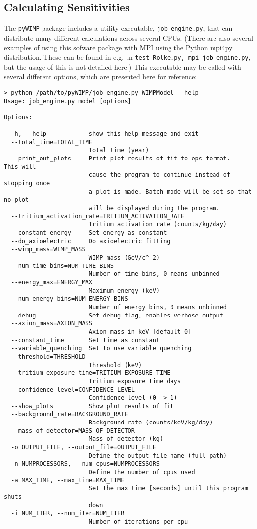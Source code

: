 		\subsection{Calculating Sensitivities}
The \lstinline!pyWIMP! package includes a utility executable, \lstinline!job_engine.py!, that can distribute
many different calculations across several CPUs.  (There are also several examples of using this sofware package
with MPI using the Python mpi4py distribution.  These can be found in e.g.~in \lstinline!test_Rolke.py, mpi_job_engine.py!, 
but the usage of this is not detailed here.)  This executable may be called with several different options, which are presented
here for reference:

				\lstset{language=csh, tabsize=4}
				\begin{lstlisting}	
> python /path/to/pyWIMP/job_engine.py WIMPModel --help
Usage: job_engine.py model [options]

Options:

  -h, --help            show this help message and exit
  --total_time=TOTAL_TIME
                        Total time (year)
  --print_out_plots     Print plot results of fit to eps format.   This will
                        cause the program to continue instead of stopping once
                        a plot is made. Batch mode will be set so that no plot
                        will be displayed during the program.
  --tritium_activation_rate=TRITIUM_ACTIVATION_RATE
                        Tritium activation rate (counts/kg/day)
  --constant_energy     Set energy as constant
  --do_axioelectric     Do axioelectric fitting
  --wimp_mass=WIMP_MASS
                        WIMP mass (GeV/c^-2)
  --num_time_bins=NUM_TIME_BINS
                        Number of time bins, 0 means unbinned
  --energy_max=ENERGY_MAX
                        Maximum energy (keV)
  --num_energy_bins=NUM_ENERGY_BINS
                        Number of energy bins, 0 means unbinned
  --debug               Set debug flag, enables verbose output
  --axion_mass=AXION_MASS
                        Axion mass in keV [default 0]
  --constant_time       Set time as constant
  --variable_quenching  Set to use variable quenching
  --threshold=THRESHOLD
                        Threshold (keV)
  --tritium_exposure_time=TRITIUM_EXPOSURE_TIME
                        Tritium exposure time days
  --confidence_level=CONFIDENCE_LEVEL
                        Confidence level (0 -> 1)
  --show_plots          Show plot results of fit
  --background_rate=BACKGROUND_RATE
                        Background rate (counts/keV/kg/day)
  --mass_of_detector=MASS_OF_DETECTOR
                        Mass of detector (kg)
  -o OUTPUT_FILE, --output_file=OUTPUT_FILE
                        Define the output file name (full path)
  -n NUMPROCESSORS, --num_cpus=NUMPROCESSORS
                        Define the number of cpus used
  -a MAX_TIME, --max_time=MAX_TIME
                        Set the max time [seconds] until this program shuts
                        down
  -i NUM_ITER, --num_iter=NUM_ITER
                        Number of iterations per cpu
				\end{lstlisting}	

